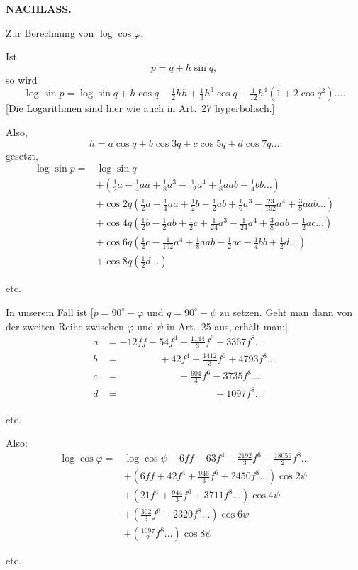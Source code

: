 \par\clearpage
{}\hfill{\small\textbf{NACHLASS.}}\hfill\null\par\medskip
{\centering [26.]\par\medskip Zur Berechnung von \(\log\cos\varphi\).\par}
Ist
\[p=q+h\sin q,\]
\noindent so wird
\[\log\sin p=\log\sin q+h\cos q-\tfrac12hh+\tfrac13h^3\cos q-\tfrac1{12}h^4(1+2\cos q^2)\ldots.\]
[Die Logarithmen sind hier wie auch in Art.~27 hyperbolisch.]

Also,
\[h=a\cos q+b\cos3q+c\cos5q+d\cos7q\ldots\]
\noindent gesetzt,
\[
\begin{aligned}
\log\sin p={}&\log\sin q\\
&+(\tfrac12a-\tfrac14aa+\tfrac18a^3-\tfrac1{12}a^4+\tfrac18aab-\tfrac14bb\ldots)\\
&+\cos2q(\tfrac12a-\tfrac14aa+\tfrac12b-\tfrac12ab+\tfrac16a^3-\tfrac{23}{192}a^4+\tfrac38aab\ldots)\\
&+\cos4q(\tfrac12b-\tfrac12ab+\tfrac12c+\tfrac1{24}a^3-\tfrac1{24}a^4+\tfrac38aab-\tfrac12ac\ldots)\\
&+\cos6q(\tfrac12c-\tfrac1{192}a^4+\tfrac18aab-\tfrac12ac-\tfrac14bb+\tfrac12d\ldots)\\
&+\cos8q(\tfrac12d\ldots)
\end{aligned}
\]
{\centering etc.\par}
In unserem Fall ist [\(p=90^\circ-\varphi\) und \(q=90^\circ-\psi\) zu setzen. Geht man dann von der zweiten Reihe zwischen \(\varphi\) und \(\psi\) in Art.~25 aus, erhält man:]
\[
\begin{aligned}
a&=-12ff-54f^4-\frac{1144}{3}f^6-3367f^8\ldots\\
b&=\phantom{-12ff-}+42f^4+\frac{1412}{3}f^6+4793f^8\ldots\\
c&=\phantom{-12ff-54f^4}-\frac{604}{3}f^6-3735f^8\ldots\\
d&=\phantom{-12ff-54f^4-\frac{1144}{3}f^6}+1097f^8\ldots
\end{aligned}
\]
{\centering etc.\par}
Also:
\[
\begin{aligned}
\log\cos\varphi={}&\log\cos\psi-6ff-63f^4-\tfrac{2192}{3}f^6-\tfrac{18059}{2}f^8\ldots\\
&+(6ff+42f^4+\tfrac{946}{3}f^6+2450f^8\ldots)\cos2\psi\\
&+(21f^4+\tfrac{944}{3}f^6+3711f^8\ldots)\cos4\psi\\
&+(\tfrac{302}{3}f^6+2320f^8\ldots)\cos6\psi\\
&+(\tfrac{1097}{2}f^8\ldots)\cos8\psi
\end{aligned}
\]
{\centering etc.\par}

